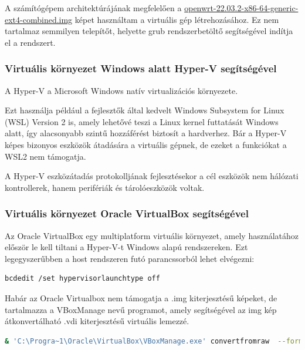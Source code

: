 \documentclass[12pt]{article}
\begin{document}

A számítógépem architektúrájának megfelelően a \href{https://downloads.openwrt.org/releases/22.03.2/targets/x86/64/openwrt-22.03.2-x86-64-generic-ext4-combined.img.gz}{openwrt-22.03.2-x86-64-generic-ext4-combined.img} képet használtam a virtuális gép létrehozásához. Ez nem tartalmaz semmilyen telepítőt, helyette grub rendszerbetöltő segítségével indítja el a rendszert.

\subsubsection{Virtuális környezet Windows alatt Hyper-V segítségével}

A Hyper-V a Microsoft Windows natív virtualizációs környezete.

Ezt használja például a fejlesztők által kedvelt Windows Subsystem for Linux (WSL) Version 2 is, amely lehetővé teszi a Linux kernel futtatását Windows alatt, így alacsonyabb szintű hozzáférést biztosít a hardverhez. \cite{wsl2} \cite{hyperv_pci} Bár a Hyper-V képes bizonyos eszközök átadására a virtuális gépnek, de ezeket a funkciókat a WSL2 nem támogatja.

A Hyper-V eszközátadás protokolljának fejlesztésekor a cél eszközök nem hálózati kontrollerek, hanem perifériák és tárolóeszközök voltak. \cite{wsl2_usbip}

\subsubsection{Virtuális környezet Oracle VirtualBox segítségével}

Az Oracle VirtualBox egy multiplatform virtuális környezet, amely használatához először le kell tiltani a Hyper-V-t Windows alapú rendszereken. \cite{virtualbox_and_hyperv}
Ezt legegyszerűbben a host rendszeren futó parancssorból lehet elvégezni:

\begin{lstlisting}[language=Bash]
  bcdedit /set hypervisorlaunchtype off
\end{lstlisting}

Habár az Oracle Virtualbox nem támogatja a .img kiterjesztésű képeket, de tartalmazza a VBoxManage nevű programot, amely segítségével az img kép átkonvertálható .vdi kiterjesztésű virtuális lemezzé.

\begin{lstlisting}[language=Bash]
  & 'C:\Progra~1\Oracle\VirtualBox\VBoxManage.exe' convertfromraw  --format VDI '.\openwrt-22.03.3-x86-64-generic-ext4-combined.img' '.\openwrt.vdi'
\end{lstlisting}
\end{document}

